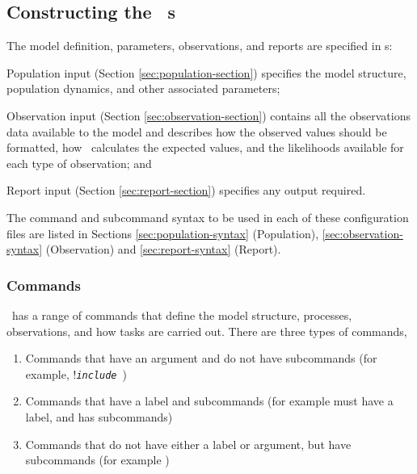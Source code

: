 \subsection{Constructing the \IBM\ \config s \label{constructing-config}}

The model definition, parameters, observations, and reports are specified in \config s:
 
\begin{description}

\item Population input (Section \ref{sec:population-section}) specifies the model structure, population dynamics, and other associated parameters;
\item Observation input (Section \ref{sec:observation-section}) contains all the observations data available to the model and  describes how the observed values should be formatted, how \IBM\ calculates the expected values, and the likelihoods available for each type of observation; and
\item Report input (Section \ref{sec:report-section}) specifies any output required.
\end{description}

The command and subcommand syntax to be used in each of these configuration files are listed in Sections \ref{sec:population-syntax} (Population), \ref{sec:observation-syntax} (Observation) and \ref{sec:report-syntax} (Report).

\subsubsection{Commands}

\IBM\ has a range of commands that define the model structure, processes, observations, and how tasks are carried out. There are three types of commands, 

\begin{enumerate}
\item Commands that have an argument and do not have subcommands (for example, !\texttt{\emph{include}}\ )
\item Commands that have a label and subcommands (for example  must have a label, and has subcommands)
\item Commands that do not have either a label or argument, but have subcommands (for example )
\end{enumerate}

